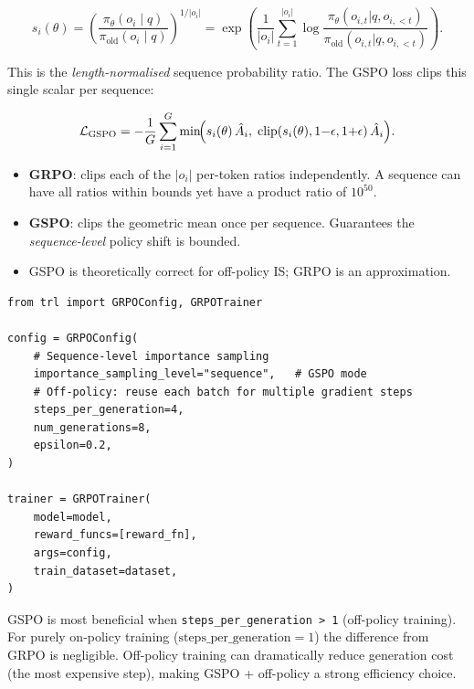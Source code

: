 \[
\boxed{
    s_i(\theta) = \left(\frac{\pi_\theta(o_i \mid q)}{\pi_{\text{old}}(o_i \mid q)}\right)^{1/|o_i|}
    = \exp\!\left(\frac{1}{|o_i|}\sum_{t=1}^{|o_i|} \log \frac{\pi_\theta(o_{i,t}|q,o_{i,<t})}{\pi_{\text{old}}(o_{i,t}|q,o_{i,<t})}\right).
  }
\]

This is the \emph{length-normalised} sequence probability ratio. The GSPO loss clips this single scalar per sequence:

\[
\mathcal{L}_{\text{GSPO}} = -\frac{1}{G}\sum_{i=1}^G
    \min\!\Bigl(s_i(\theta)\,\hat{A}_i,\;
               \mathrm{clip}(s_i(\theta),1{-}\epsilon,1{+}\epsilon)\,\hat{A}_i\Bigr).
\]

\begin{keybox}
\begin{itemize}
  \item \textbf{GRPO}: clips each of the $|o_i|$ per-token ratios independently. A sequence can have all ratios within bounds yet have a product ratio of $10^{50}$.
  \item \textbf{GSPO}: clips the geometric mean once per sequence. Guarantees the \emph{sequence-level} policy shift is bounded.
  \item GSPO is theoretically correct for off-policy IS; GRPO is an approximation.
\end{itemize}
\end{keybox}

\begin{examplebox}
\begin{lstlisting}[style=pythonstyle]
from trl import GRPOConfig, GRPOTrainer

config = GRPOConfig(
    # Sequence-level importance sampling
    importance_sampling_level="sequence",   # GSPO mode
    # Off-policy: reuse each batch for multiple gradient steps
    steps_per_generation=4,
    num_generations=8,
    epsilon=0.2,
)

trainer = GRPOTrainer(
    model=model,
    reward_funcs=[reward_fn],
    args=config,
    train_dataset=dataset,
)
\end{lstlisting}
\end{examplebox}

\begin{warningbox}
GSPO is most beneficial when \texttt{steps\_per\_generation > 1} (off-policy training). For purely on-policy training ($\text{steps\_per\_generation}=1$) the difference from GRPO is negligible. Off-policy training can dramatically reduce generation cost (the most expensive step), making GSPO + off-policy a strong efficiency choice.
\end{warningbox}

